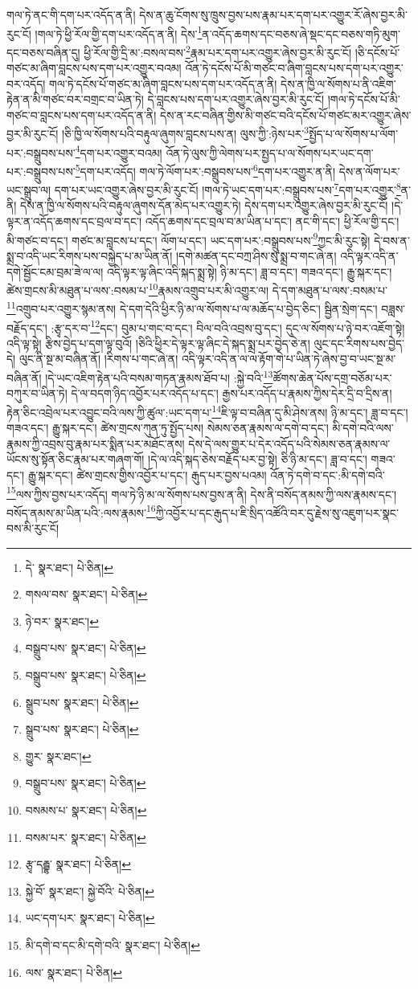 གལ་ཏེ་ནང་གི་དག་པར་འདོད་ན་ནི། དེས་ན་ཆུ་ངོགས་སུ་ཁྲུས་བྱས་པས་རྣམ་པར་དག་པར་འགྱུར་རོ་ཞེས་བྱར་མི་རུང་ངོ། །གལ་ཏེ་ཕྱི་རོལ་གྱི་དག་པར་འདོད་ན་ནི། དེས་\footnote{དེ་  སྣར་ཐང་།  པེ་ཅིན། }ན་འདོད་ཆགས་དང་བཅས་ཞེ་སྡང་དང་བཅས་གཏི་མུག་དང་བཅས་བཞིན་དུ། ཕྱི་རོལ་གྱི་དྲི་མ་:བསལ་བས་\footnote{གསལ་བས་  སྣར་ཐང་།  པེ་ཅིན། }རྣམ་པར་དག་པར་འགྱུར་ཞེས་བྱར་མི་རུང་ངོ། །ཅི་དངོས་པོ་གཙང་མ་ཞིག་བླངས་པས་དག་པར་འགྱུར་བའམ། འོན་ཏེ་དངོས་པོ་མི་གཙང་བ་ཞིག་བླངས་པས་དག་པར་འགྱུར་བར་འདོད། གལ་ཏེ་དངོས་པོ་གཙང་མ་ཞིག་བླངས་པས་དག་པར་འདོད་ན་ནི། དེས་ན་ཁྱི་ལ་སོགས་པ་ནི་འཇིག་རྟེན་ན་མི་གཙང་བར་བགྲང་བ་ཡིན་ཏེ། དེ་བླངས་པས་དག་པར་འགྱུར་ཞེས་བྱར་མི་རུང་ངོ། །གལ་ཏེ་དངོས་པོ་མི་གཙང་བ་བླངས་པས་དག་པར་འདོད་ན་ནི། དེས་ན་རང་བཞིན་གྱིས་མི་གཙང་བའི་དངོས་པོ་གཙང་མར་འགྱུར་ཞེས་བྱར་མི་རུང་ངོ། །ཅི་ཁྱི་ལ་སོགས་པའི་བརྟུལ་ཞུགས་བླངས་པས་ན། ལུས་ཀྱི་:ཉེས་པར་\footnote{ཉེ་བར་  སྣར་ཐང་། }སྤྱོད་པ་ལ་སོགས་པ་ལོག་པར་:བསྒྲུབས་པས་\footnote{བསྒྲུབ་པས་  སྣར་ཐང་།  པེ་ཅིན། }དག་པར་འགྱུར་བའམ། འོན་ཏེ་ལུས་ཀྱི་ལེགས་པར་སྤྱད་པ་ལ་སོགས་པར་ཡང་དག་པར་:བསྒྲུབས་པས་\footnote{བསྒྲུབ་པས་  སྣར་ཐང་།  པེ་ཅིན། }དག་པར་འདོད། གལ་ཏེ་ལོག་པར་:བསྒྲུབས་པས་\footnote{སྒྲུབ་པས་  སྣར་ཐང་།  པེ་ཅིན། }དག་པར་འགྱུར་ན་ནི། དེས་ན་ལོག་པར་ཡང་སྒྲུབ་ལ། དག་པར་ཡང་འགྱུར་ཞེས་བྱར་མི་རུང་ངོ། །གལ་ཏེ་ཡང་དག་པར་:བསྒྲུབས་པས་\footnote{སྒྲུབ་པས་  སྣར་ཐང་།  པེ་ཅིན། }དག་པར་འགྱུར་\footnote{གྱུར་  སྣར་ཐང་། }ན་ནི། དེས་ན་ཁྱི་ལ་སོགས་པའི་བརྟུལ་ཞུགས་དོན་མེད་པར་འགྱུར་ཏེ། དེས་དག་པར་འགྱུར་ཞེས་བྱར་མི་རུང་ངོ། །དེ་ལྟར་ན་འདོད་ཆགས་དང་བྲལ་བ་དང་། འདོད་ཆགས་དང་བྲལ་བ་མ་ཡིན་པ་དང་། ནང་གི་དང་། ཕྱི་རོལ་གྱི་དང་། མི་གཙང་བ་དང་། གཙང་མ་བླངས་པ་དང་། ལོག་པ་དང་། ཡང་དག་པར་:བསྒྲུབས་པས་\footnote{བསྒྲུབ་པས་  སྣར་ཐང་།  པེ་ཅིན། }ཀྱང་མི་རུང་སྟེ། དེ་བས་ན་སྨྲ་བ་འདི་ཡང་རིགས་པས་བསྐྱེད་པ་མ་ཡིན་ནོ། །དགེ་མཚན་དང་བཀྲ་ཤིས་སུ་སྨྲ་བ་གང་ཞེ་ན། འདི་ལྟར་འདི་ན་དགེ་སྦྱོང་ངམ་བྲམ་ཟེ་ལ་ལ། འདི་ལྟར་ལྟ་ཞིང་འདི་སྐད་སྨྲ་སྟེ། ཉི་མ་དང་། ཟླ་བ་དང་། གཟའ་དང་། རྒྱུ་སྐར་དང་། ཚེས་གྲངས་མི་མཐུན་པ་ལས་:བསམ་པ་\footnote{བསམས་པ་  སྣར་ཐང་།  པེ་ཅིན། }རྣམས་འགྲུབ་པར་མི་འགྱུར་ལ། དེ་དག་མཐུན་པ་ལས་:བསམ་པ་\footnote{བསམ་པར་  སྣར་ཐང་།  པེ་ཅིན། }འགྲུབ་པར་འགྱུར་སྙམ་ནས། དེ་དག་དེའི་ཕྱིར་ཉི་མ་ལ་སོགས་པ་ལ་མཆོད་པ་བྱེད་ཅིང་། སྦྱིན་སྲེག་དང་། བཟླས་བརྗོད་དང་། :རྩྭ་དར་བ་\footnote{རྩྭ་དརྦྷ་  སྣར་ཐང་།  པེ་ཅིན། }དང་། བུམ་པ་གང་བ་དང་། བིལ་བའི་འབྲས་བུ་དང་། དུང་ལ་སོགས་པ་ཉེ་བར་འཇོག་སྟེ། འདི་ལྟ་སྟེ། རྩིས་བྱེད་པ་དག་ལྟ་བུའོ། །ཅིའི་ཕྱིར་དེ་ལྟར་ལྟ་ཞིང་དེ་སྐད་སྨྲ་པར་བྱེད་ཅེ་ན། ལུང་དང་རིགས་པས་བྱེད་དེ། ལུང་ནི་སྔ་མ་བཞིན་ནོ། །རིགས་པ་གང་ཞེ་ན། འདི་ལྟར་འདི་ན་ལ་ལ་རྟོག་གེ་པ་ཡིན་ཏེ་ཞེས་བྱ་བ་ཡང་སྔ་མ་བཞིན་ནོ། །དེ་ཡང་འཇིག་རྟེན་པའི་བསམ་གཏན་རྣམས་ཐོབ་པ། :སྐྱེ་བའི་\footnote{སྐྱེ་བོ་  སྣར་ཐང་། སྐྱེ་བོའི་  པེ་ཅིན། }ཚོགས་ཆེན་པོས་དགྲ་བཅོམ་པར་བཀུར་བ་ཡིན་ཏེ། དེ་ལ་བདག་ཉིད་འབྱོར་པར་འདོད་པ་དང་། རྒྱས་པར་འདོད་པ་རྣམས་ཀྱིས་དེར་དྲི་བ་དྲིས་ན། རྟེན་ཅིང་འབྲེལ་པར་འབྱུང་བའི་ལས་ཀྱི་ཚུལ་:ཡང་དག་པ་\footnote{ཡང་དག་པར་  སྣར་ཐང་།  པེ་ཅིན། }ཇི་ལྟ་བ་བཞིན་དུ་མི་ཤེས་ནས། ཉི་མ་དང་། ཟླ་བ་དང་། གཟའ་དང་། རྒྱུ་སྐར་དང་། ཚེས་གྲངས་ཀུན་ཏུ་སྤྱོད་པས། སེམས་ཅན་རྣམས་ལ་དགེ་བ་དང་། མི་དགེ་བའི་ལས་རྣམས་ཀྱི་འབྲས་བུ་རྣམ་པར་སྨིན་པར་མཐོང་ནས། དེས་དེ་ལས་གྱུར་པ་དེར་འདོད་པའི་སེམས་ཅན་རྣམས་ལ་ཡོངས་སུ་སྟོན་ཅིང་རྣམ་པར་གཞག་གོ། །དེ་ལ་འདི་སྐད་ཅེས་བརྗོད་པར་བྱ་སྟེ། ཅི་ཉི་མ་དང་། ཟླ་བ་དང་། གཟའ་དང་། རྒྱུ་སྐར་དང་། ཚེས་གྲངས་གྱིས་འབྱོར་པ་དང་། རྒུད་པར་བྱས་པའམ། འོན་ཏེ་དགེ་བ་དང་:མི་དགེ་བའི་\footnote{མི་དགེ་བ་དང་མི་དགེ་བའི་  སྣར་ཐང་།  པེ་ཅིན། }ལས་ཀྱིས་བྱས་པར་འདོད། གལ་ཏེ་ཉི་མ་ལ་སོགས་པས་བྱས་ན་ནི། དེས་ནི་བསོད་ནམས་ཀྱི་ལས་རྣམས་དང་། བསོད་ནམས་མ་ཡིན་པའི་:ལས་རྣམས་\footnote{ལས་  སྣར་ཐང་།  པེ་ཅིན། }ཀྱི་འབྱོར་པ་དང་རྒུད་པ་ཇི་སྲིད་འཚོའི་བར་དུ་རྗེས་སུ་འཇུག་པར་སྣང་བས་མི་རུང་ངོ། 